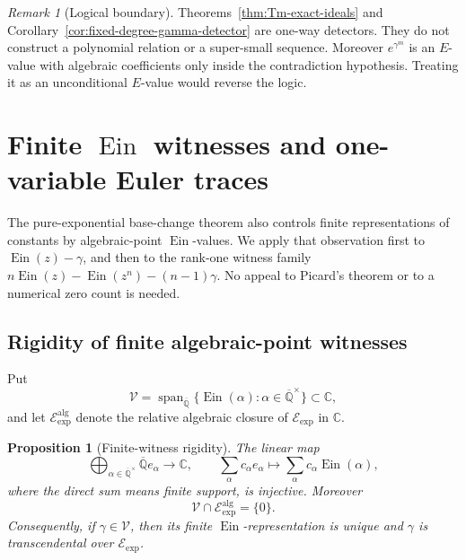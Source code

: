 \documentclass[11pt]{article}
\newtheorem{proposition}[theorem]{Proposition}
\theoremstyle{definition}
\theoremstyle{remark}
\newtheorem{remark}[theorem]{Remark}
\newcommand{\Qbar}{\overline{\mathbb Q}}
\newcommand{\C}{\mathbb C}
\newcommand{\Ein}{\operatorname{Ein}}
\newcommand{\Eexp}{\mathcal E_{\mathrm{exp}}}
\begin{document}
\begin{remark}[Logical boundary]
Theorems~\ref{thm:Tm-exact-ideals} and
Corollary~\ref{cor:fixed-degree-gamma-detector} are one-way detectors.
They do not construct a polynomial relation or a super-small sequence.
Moreover \(e^{\gamma^m}\) is an \(E\)-value with algebraic coefficients
only inside the contradiction hypothesis.  Treating it as an unconditional
\(E\)-value would reverse the logic.
\end{remark}

\section{Finite \texorpdfstring{$\Ein$}{Ein} witnesses and
one-variable Euler traces}
\label{sec:finite-witness-zero-traces}

The pure-exponential base-change theorem also controls finite
representations of constants by algebraic-point \(\Ein\)-values.  We apply
that observation first to \(\Ein(z)-\gamma\), and then to the rank-one
witness family
\(n\Ein(z)-\Ein(z^n)-(n-1)\gamma\).  No appeal to Picard's theorem or to a
numerical zero count is needed.

\subsection{Rigidity of finite algebraic-point witnesses}

Put
\[
 \mathscr V=\operatorname{span}_{\Qbar}
 \{\Ein(\alpha):\alpha\in\Qbar^\times\}\subset\C,
\]
and let \(\Eexp^{\mathrm{alg}}\) denote the relative algebraic closure of
\(\Eexp\) in \(\C\).

\begin{proposition}[Finite-witness rigidity]
\label{prop:finite-ein-witness-rigidity}
The linear map
\[
 \bigoplus_{\alpha\in\Qbar^\times}\Qbar e_\alpha
 \longrightarrow\C,
 \qquad
 \sum_\alpha c_\alpha e_\alpha\longmapsto
 \sum_\alpha c_\alpha\Ein(\alpha),
\]
where the direct sum means finite support, is injective.  Moreover
\begin{equation}\label{eq:V-Eexp-intersection}
 \mathscr V\cap\Eexp^{\mathrm{alg}}=\{0\}.
\end{equation}
Consequently, if \(\gamma\in\mathscr V\), then its finite
\(\Ein\)-representation is unique and \(\gamma\) is transcendental over
\(\Eexp\).
\end{proposition}
\end{document}
